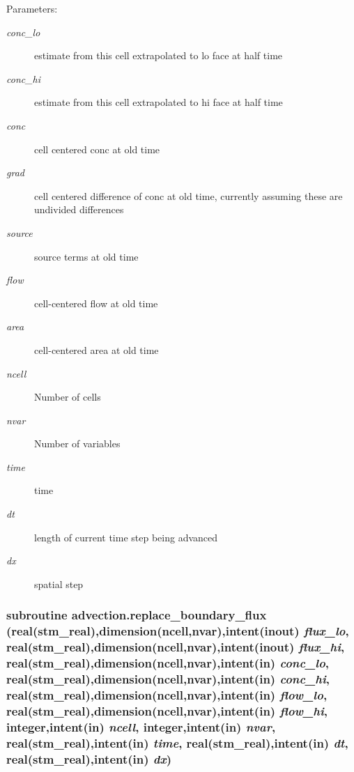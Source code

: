 \begin{Desc}
\item[Parameters:]
\begin{description}
\item[{\em conc\_\-lo}]estimate from this cell extrapolated to lo face at half time\item[{\em conc\_\-hi}]estimate from this cell extrapolated to hi face at half time\item[{\em conc}]cell centered conc at old time\item[{\em grad}]cell centered difference of conc at old time, currently assuming these are undivided differences\item[{\em source}]source terms at old time\item[{\em flow}]cell-centered flow at old time\item[{\em area}]cell-centered area at old time\item[{\em ncell}]Number of cells\item[{\em nvar}]Number of variables\item[{\em time}]time\item[{\em dt}]length of current time step being advanced\item[{\em dx}]spatial step \end{description}
\end{Desc}
\hypertarget{a00049_ce0b27ec0ac171c15a919d07fb3b32c3}{
\subsubsection[{replace\_\-boundary\_\-flux}]{\setlength{\rightskip}{0pt plus 5cm}subroutine advection.replace\_\-boundary\_\-flux (real(stm\_\-real),dimension(ncell,nvar),intent(inout) {\em flux\_\-lo}, \/  real(stm\_\-real),dimension(ncell,nvar),intent(inout) {\em flux\_\-hi}, \/  real(stm\_\-real),dimension(ncell,nvar),intent(in) {\em conc\_\-lo}, \/  real(stm\_\-real),dimension(ncell,nvar),intent(in) {\em conc\_\-hi}, \/  real(stm\_\-real),dimension(ncell,nvar),intent(in) {\em flow\_\-lo}, \/  real(stm\_\-real),dimension(ncell,nvar),intent(in) {\em flow\_\-hi}, \/  integer,intent(in) {\em ncell}, \/  integer,intent(in) {\em nvar}, \/  real(stm\_\-real),intent(in) {\em time}, \/  real(stm\_\-real),intent(in) {\em dt}, \/  real(stm\_\-real),intent(in) {\em dx})}}
\label{a00049_ce0b27ec0ac171c15a919d07fb3b32c3}


